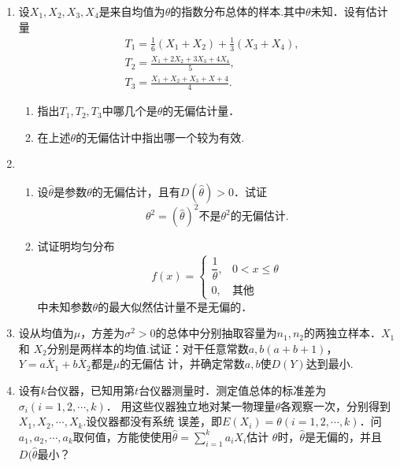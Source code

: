 \documentclass[10pt,a4paper]{article}
\begin{document}
\begin{enumerate}
    \item 设$X_1,X_2,X_3,X_4$是来自均值为$\theta$的指数分布总体的样本.其中$\theta$未知．设有估计量
    \begin{equation}
        \begin{split}
            & T_1=\frac{1}{6}(X_1+X_2)+\frac{1}{3}(X_3+X_4),\\
            & T_2=\frac{X_1+2X_2+3X_3+4X_4}{5},\\
            & T_3=\frac{X_1+X_2+X_3+X+4}{4}.
        \end{split}
        \nonumber
    \end{equation}
    \begin{enumerate}
        \item 指出$T_1,T_2,T_3$中哪几个是$\theta$的无偏估计量．
        \item 在上述$\theta$的无偏估计中指出哪一个较为有效.
    \end{enumerate}



    \item \begin{enumerate}
        \item 设$\hat{\theta}$是参数$\theta$的无偏估计，且有$D(\hat{\theta})>0$．试证
        $$\hat{\theta^2}=(\hat{\theta})^2\mbox{不是}\theta^2\mbox{的无偏估计.}$$
        \item 试证明均匀分布
        $$f(x)=\left\{\begin{array}{ll}
            \dfrac{1}{\theta}, & 0<x\leq \theta\\
            0, & \mbox{其他}
        \end{array}\right.$$
        中未知参数$\theta$的最大似然估计量不是无偏的．
    \end{enumerate}




    \item 设从均值为$\mu$，方差为$\sigma^2>0$的总体中分别抽取容量为$n_1,n_2$的两独立样本．$X_1$和
    $X_2$分别是两样本的均值.试证：对干任意常数$a,b(a+b+1)$，$Y=a\overline{X}_1+b\overline{X}_2$都是$\mu$的无偏估
    计，并确定常数$a,b$使$D(Y)$达到最小.




    \item 设有$k$台仪器，已知用第$t$台仪器测量时．测定值总体的标准差为$\sigma_i(i=1,2,\cdots,k)$．
    用这些仪器独立地对某一物理量$\theta$各观察一次，分别得到$X_1,X_2,\cdots,X_k$.设仪器都没有系统
    误差，即$E(X_i)=\theta(i=1,2,\cdots,k)$．问$a_1,a_2,\cdots,a_k$取何值，方能使使用$\displaystyle{\hat{\theta}=\sum_{i=1}^k a_iX_i}$估计
    $\theta$时，$\hat{\theta}$是无偏的，并且$D(\hat{\theta}$最小？





\end{enumerate}
\end{document}

